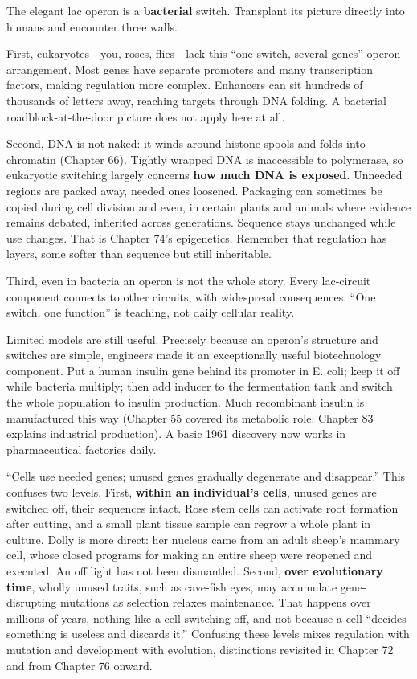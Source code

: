 The elegant lac operon is a \textbf{bacterial} switch. Transplant its picture directly into humans and encounter three walls.

First, eukaryotes---you, roses, flies---lack this ``one switch, several genes'' operon arrangement. Most genes have separate promoters and many transcription factors, making regulation more complex. Enhancers can sit hundreds of thousands of letters away, reaching targets through DNA folding. A bacterial roadblock-at-the-door picture does not apply here at all.

Second, DNA is not naked: it winds around histone spools and folds into chromatin (Chapter 66). Tightly wrapped DNA is inaccessible to polymerase, so eukaryotic switching largely concerns \textbf{how much DNA is exposed}. Unneeded regions are packed away, needed ones loosened. Packaging can sometimes be copied during cell division and even, in certain plants and animals where evidence remains debated, inherited across generations. Sequence stays unchanged while use changes. That is Chapter 74's epigenetics. Remember that regulation has layers, some softer than sequence but still inheritable.

Third, even in bacteria an operon is not the whole story. Every lac-circuit component connects to other circuits, with widespread consequences. ``One switch, one function'' is teaching, not daily cellular reality.

Limited models are still useful. Precisely because an operon's structure and switches are simple, engineers made it an exceptionally useful biotechnology component. Put a human insulin gene behind its promoter in E. coli; keep it off while bacteria multiply; then add inducer to the fermentation tank and switch the whole population to insulin production. Much recombinant insulin is manufactured this way (Chapter 55 covered its metabolic role; Chapter 83 explains industrial production). A basic 1961 discovery now works in pharmaceutical factories daily.

\begin{wuqu}
``Cells use needed genes; unused genes gradually degenerate and disappear.'' This confuses two levels. First, \textbf{within an individual's cells}, unused genes are switched off, their sequences intact. Rose stem cells can activate root formation after cutting, and a small plant tissue sample can regrow a whole plant in culture. Dolly is more direct: her nucleus came from an adult sheep's mammary cell, whose closed programs for making an entire sheep were reopened and executed. An off light has not been dismantled. Second, \textbf{over evolutionary time}, wholly unused traits, such as cave-fish eyes, may accumulate gene-disrupting mutations as selection relaxes maintenance. That happens over millions of years, nothing like a cell switching off, and not because a cell ``decides something is useless and discards it.'' Confusing these levels mixes regulation with mutation and development with evolution, distinctions revisited in Chapter 72 and from Chapter 76 onward.
\end{wuqu}

